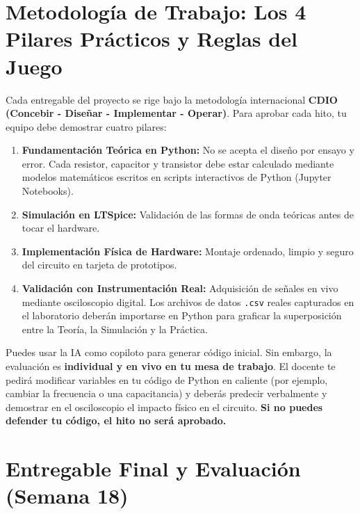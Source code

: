 \documentclass[11pt, a4paper]{article}
\begin{document}
\section{Metodología de Trabajo: Los 4 Pilares Prácticos y Reglas del Juego}

Cada entregable del proyecto se rige bajo la metodología internacional \textbf{CDIO (Concebir - Diseñar - Implementar - Operar)}. Para aprobar cada hito, tu equipo debe demostrar cuatro pilares:

\begin{enumerate}
    \item \textbf{Fundamentación Teórica en Python:} No se acepta el diseño por ensayo y error. Cada resistor, capacitor y transistor debe estar calculado mediante modelos matemáticos escritos en scripts interactivos de Python (Jupyter Notebooks).
    \item \textbf{Simulación en LTSpice:} Validación de las formas de onda teóricas antes de tocar el hardware.
    \item \textbf{Implementación Física de Hardware:} Montaje ordenado, limpio y seguro del circuito en tarjeta de prototipos.
    \item \textbf{Validación con Instrumentación Real:} Adquisición de señales en vivo mediante osciloscopio digital. Los archivos de datos \texttt{.csv} reales capturados en el laboratorio deberán importarse en Python para graficar la superposición entre la Teoría, la Simulación y la Práctica.
\end{enumerate}

\begin{importante}
    Puedes usar la IA como copiloto para generar código inicial. Sin embargo, la evaluación es \textbf{individual y en vivo en tu mesa de trabajo}. El docente te pedirá modificar variables en tu código de Python en caliente (por ejemplo, cambiar la frecuencia o una capacitancia) y deberás predecir verbalmente y demostrar en el osciloscopio el impacto físico en el circuito. \textbf{Si no puedes defender tu código, el hito no será aprobado.}
\end{importante}

\section{Entregable Final y Evaluación (Semana 18)}
\end{document}
